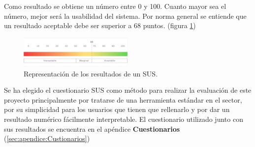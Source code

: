 Como resultado se obtiene un número entre 0 y 100. Cuanto mayor sea el número, mejor será la usabilidad del sistema. Por norma general se entiende que un resultado aceptable debe ser superior a 68 puntos. (figura \ref{fig:MU_sus})


\begin{figure}
	\centering
	\includegraphics[width=0.5\textwidth]{03.EstudioProblema/04.MetodologiaAUsar/00.Figuras/03.sus.png}
	\caption{Representación de los resultados de un SUS. \cite{MU_eval_sus}}
	\label{fig:MU_sus}
\end{figure}


Se ha elegido el cuestionario SUS como método para realizar la evaluación de este proyecto principalmente por tratarse de una herramienta estándar en el sector, por su simplicidad para los usuarios que tienen que rellenarlo y por dar un resultado numérico fácilmente interpretable. El cuestionario utilizado junto con sus resultados se encuentra en el apéndice \textbf{Cuestionarios} (\ref{sec:apendice:Custionarios}) 


















\chapterend